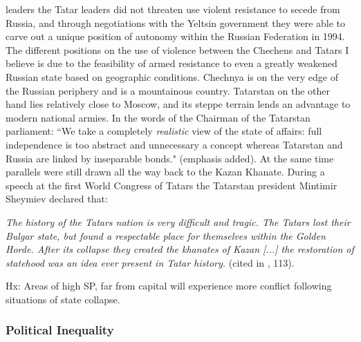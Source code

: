 \documentclass[12pt]{article}
\begin{document}
leaders the Tatar leaders did not threaten use violent resistance to secede from
Russia, and through negotiations with the Yeltsin government they were able to
carve out a unique position of autonomy within the Russian Federation in 1994.
The different positions on the use of violence between the Chechens and Tatars
I believe is due to the feasibility of armed resistance to even a greatly
weakened Russian state based on geographic conditions. Chechnya is on the very
edge of the Russian periphery and is a mountainous country. Tatarstan on the
other hand lies relatively close to Moscow, and its steppe terrain lends an
advantage to modern national armies. In the words of the Chairman of the
Tatarstan parliament: ``We take a completely \textit{realistic} view of the
state of affairs: full independence is too abstract and unnecessary a concept
whereas Tatarstan and Russia are linked by inseparable bonds."
\citep{Sharifzhanov_2007}(emphasis added). At the same time parallels were still
drawn all the way back to the Kazan Khanate. During a speech at the first World
Congress of Tatars the Tatarstan president Mintimir Sheymiev declared that:

\textit{The history of the Tatars nation is very difficult and tragic. The
Tatars lost their Bulgar state, but found a respectable place for themselves
within the Golden Horde. After its collapse they created the khanates of Kazan
[...] the restoration of statehood was an idea ever present in Tatar history.}
(cited in \citet{mustafin1995pervyi}, 113).

Hx: Areas of high SP, far from capital will experience more conflict following
situations of state collapse.

\subsubsection{Political Inequality}
\end{document}
